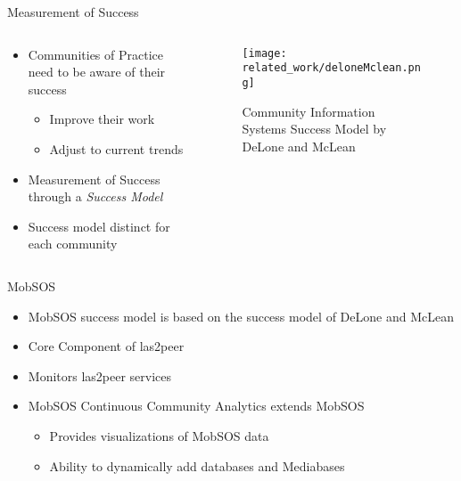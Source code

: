 \begin{frame}{Measurement of Success}
  \begin{columns}
    \begin{column}[]{0.3\textwidth}
      \begin{itemize}
        \item Communities of Practice need to be aware of their success
              \begin{itemize}
                \item Improve their work
                \item Adjust to current trends
              \end{itemize}
        \item Measurement of Success through a \emph{Success Model}
        \item Success model distinct for each community
      \end{itemize}
    \end{column}
    \begin{column}[]{0.7\textwidth}
      \begin{figure}
        \centering
        \texttt{[image: related\_work/deloneMclean.png]}
        \caption{Community Information Systems Success Model by DeLone and McLean \cite{DeMc92}}
      \end{figure}
    \end{column}
  \end{columns}
\end{frame}



\begin{frame}{MobSOS}

  \begin{itemize}
    \item MobSOS success model is based on the success model of DeLone and McLean
    \item Core Component of las2peer
    \item Monitors las2peer services
    \item MobSOS Continuous Community Analytics extends MobSOS
          \begin{itemize}
            \item Provides visualizations of MobSOS data
            \item Ability to dynamically add databases and Mediabases
          \end{itemize}
  \end{itemize}
\end{frame}

